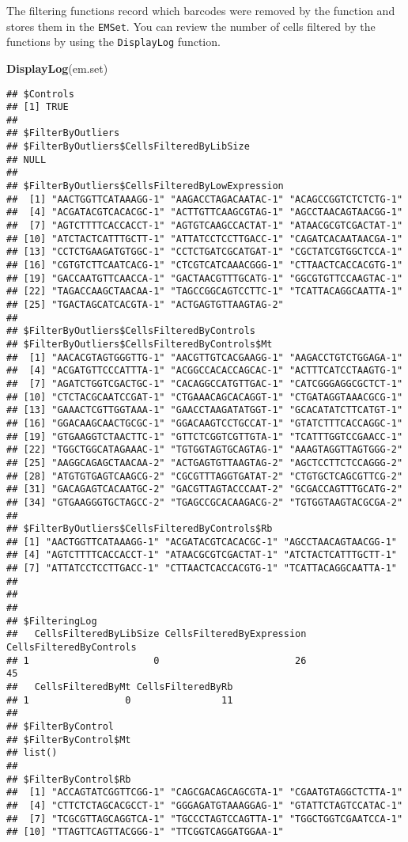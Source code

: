 \documentclass[]{article}
\newenvironment{Shaded}{\begin{snugshade}}{\end{snugshade}}
\newcommand{\KeywordTok}[1]{\textcolor[rgb]{0.13,0.29,0.53}{\textbf{#1}}}
\newcommand{\NormalTok}[1]{#1}
\begin{document}
The filtering functions record which barcodes were removed by the
function and stores them in the \texttt{EMSet}. You can review the
number of cells filtered by the functions by using the
\texttt{DisplayLog} function.

\begin{Shaded}
\begin{Highlighting}[]
\KeywordTok{DisplayLog}\NormalTok{(em.set)}
\end{Highlighting}
\end{Shaded}

\begin{verbatim}
## $Controls
## [1] TRUE
## 
## $FilterByOutliers
## $FilterByOutliers$CellsFilteredByLibSize
## NULL
## 
## $FilterByOutliers$CellsFilteredByLowExpression
##  [1] "AACTGGTTCATAAAGG-1" "AAGACCTAGACAATAC-1" "ACAGCCGGTCTCTCTG-1"
##  [4] "ACGATACGTCACACGC-1" "ACTTGTTCAAGCGTAG-1" "AGCCTAACAGTAACGG-1"
##  [7] "AGTCTTTTCACCACCT-1" "AGTGTCAAGCCACTAT-1" "ATAACGCGTCGACTAT-1"
## [10] "ATCTACTCATTTGCTT-1" "ATTATCCTCCTTGACC-1" "CAGATCACAATAACGA-1"
## [13] "CCTCTGAAGATGTGGC-1" "CCTCTGATCGCATGAT-1" "CGCTATCGTGGCTCCA-1"
## [16] "CGTGTCTTCAATCACG-1" "CTCGTCATCAAACGGG-1" "CTTAACTCACCACGTG-1"
## [19] "GACCAATGTTCAACCA-1" "GACTAACGTTTGCATG-1" "GGCGTGTTCCAAGTAC-1"
## [22] "TAGACCAAGCTAACAA-1" "TAGCCGGCAGTCCTTC-1" "TCATTACAGGCAATTA-1"
## [25] "TGACTAGCATCACGTA-1" "ACTGAGTGTTAAGTAG-2"
## 
## $FilterByOutliers$CellsFilteredByControls
## $FilterByOutliers$CellsFilteredByControls$Mt
##  [1] "AACACGTAGTGGGTTG-1" "AACGTTGTCACGAAGG-1" "AAGACCTGTCTGGAGA-1"
##  [4] "ACGATGTTCCCATTTA-1" "ACGGCCACACCAGCAC-1" "ACTTTCATCCTAAGTG-1"
##  [7] "AGATCTGGTCGACTGC-1" "CACAGGCCATGTTGAC-1" "CATCGGGAGGCGCTCT-1"
## [10] "CTCTACGCAATCCGAT-1" "CTGAAACAGCACAGGT-1" "CTGATAGGTAAACGCG-1"
## [13] "GAAACTCGTTGGTAAA-1" "GAACCTAAGATATGGT-1" "GCACATATCTTCATGT-1"
## [16] "GGACAAGCAACTGCGC-1" "GGACAAGTCCTGCCAT-1" "GTATCTTTCACCAGGC-1"
## [19] "GTGAAGGTCTAACTTC-1" "GTTCTCGGTCGTTGTA-1" "TCATTTGGTCCGAACC-1"
## [22] "TGGCTGGCATAGAAAC-1" "TGTGGTAGTGCAGTAG-1" "AAAGTAGGTTAGTGGG-2"
## [25] "AAGGCAGAGCTAACAA-2" "ACTGAGTGTTAAGTAG-2" "AGCTCCTTCTCCAGGG-2"
## [28] "ATGTGTGAGTCAAGCG-2" "CGCGTTTAGGTGATAT-2" "CTGTGCTCAGCGTTCG-2"
## [31] "GACAGAGTCACAATGC-2" "GACGTTAGTACCCAAT-2" "GCGACCAGTTTGCATG-2"
## [34] "GTGAAGGGTGCTAGCC-2" "TGAGCCGCACAAGACG-2" "TGTGGTAAGTACGCGA-2"
## 
## $FilterByOutliers$CellsFilteredByControls$Rb
## [1] "AACTGGTTCATAAAGG-1" "ACGATACGTCACACGC-1" "AGCCTAACAGTAACGG-1"
## [4] "AGTCTTTTCACCACCT-1" "ATAACGCGTCGACTAT-1" "ATCTACTCATTTGCTT-1"
## [7] "ATTATCCTCCTTGACC-1" "CTTAACTCACCACGTG-1" "TCATTACAGGCAATTA-1"
## 
## 
## 
## $FilteringLog
##   CellsFilteredByLibSize CellsFilteredByExpression CellsFilteredByControls
## 1                      0                        26                      45
##   CellsFilteredByMt CellsFilteredByRb
## 1                 0                11
## 
## $FilterByControl
## $FilterByControl$Mt
## list()
## 
## $FilterByControl$Rb
##  [1] "ACCAGTATCGGTTCGG-1" "CAGCGACAGCAGCGTA-1" "CGAATGTAGGCTCTTA-1"
##  [4] "CTTCTCTAGCACGCCT-1" "GGGAGATGTAAAGGAG-1" "GTATTCTAGTCCATAC-1"
##  [7] "TCGCGTTAGCAGGTCA-1" "TGCCCTAGTCCAGTTA-1" "TGGCTGGTCGAATCCA-1"
## [10] "TTAGTTCAGTTACGGG-1" "TTCGGTCAGGATGGAA-1"
\end{verbatim}
\end{document}
